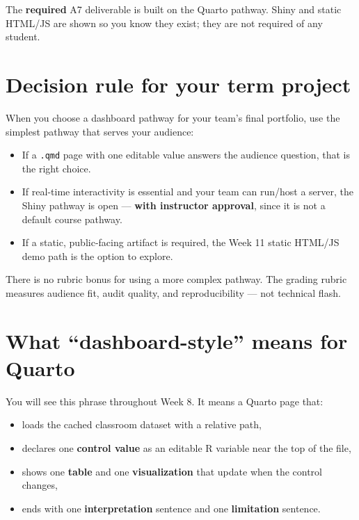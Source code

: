\documentclass[
  letterpaper,
  DIV=11,
  numbers=noendperiod,
  oneside]{scrreprt}
\providecommand{\tightlist}{%
  \setlength{\itemsep}{0pt}\setlength{\parskip}{0pt}}
\begin{document}
The \textbf{required} A7 deliverable is built on the Quarto pathway.
Shiny and static HTML/JS are shown so you know they exist; they are not
required of any student.

\section*{Decision rule for your term
project}\label{decision-rule-for-your-term-project}


When you choose a dashboard pathway for your team's final portfolio, use
the simplest pathway that serves your audience:

\begin{itemize}
\tightlist
\item
  If a \texttt{.qmd} page with one editable value answers the audience
  question, that is the right choice.
\item
  If real-time interactivity is essential and your team can run/host a
  server, the Shiny pathway is open --- \textbf{with instructor
  approval}, since it is not a default course pathway.
\item
  If a static, public-facing artifact is required, the Week 11 static
  HTML/JS demo path is the option to explore.
\end{itemize}

There is no rubric bonus for using a more complex pathway. The grading
rubric measures audience fit, audit quality, and reproducibility --- not
technical flash.

\section*{What ``dashboard-style'' means for
Quarto}\label{what-dashboard-style-means-for-quarto}


You will see this phrase throughout Week 8. It means a Quarto page that:

\begin{itemize}
\tightlist
\item
  loads the cached classroom dataset with a relative path,
\item
  declares one \textbf{control value} as an editable R variable near the
  top of the file,
\item
  shows one \textbf{table} and one \textbf{visualization} that update
  when the control changes,
\item
  ends with one \textbf{interpretation} sentence and one
  \textbf{limitation} sentence.
\end{itemize}
\end{document}
